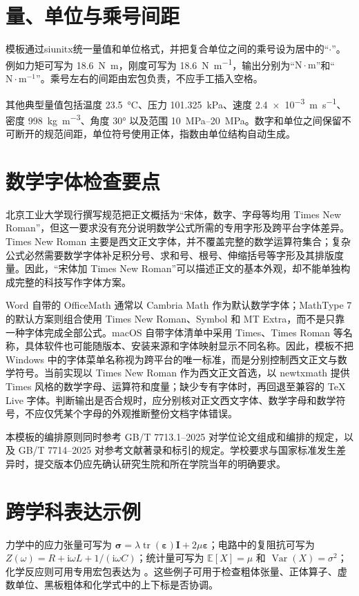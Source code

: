 \section{量、单位与乘号间距}
模板通过\mbox{siunitx}统一量值和单位格式，并把复合单位之间的乘号设为居中的“$\cdot$”。例如力矩可写为 \qty{18.6}{\newton\meter}，刚度可写为 \qty{18.6}{\newton\per\meter}，输出分别为“$\mathrm{N\cdot m}$”和“$\mathrm{N\cdot m^{-1}}$”。乘号左右的间距由宏包负责，不应手工插入空格。

其他典型量值包括温度 \qty{23.5}{\degreeCelsius}、压力 \qty{101.325}{\kilo\pascal}、速度 \qty{2.4e-3}{\meter\per\second}、密度 \qty{998}{\kilogram\per\cubic\meter}、角度 \ang{30} 以及范围 \qtyrange{10}{20}{\mega\pascal}。数字和单位之间保留不可断开的规范间距，单位符号使用正体，指数由单位结构自动生成。

\section{数学字体检查要点}
北京工业大学现行撰写规范把正文概括为“宋体，数字、字母等均用 Times New Roman”，但这一要求没有充分说明数学公式所需的专用字形及跨平台字体差异\cite{bjut2023guide}。Times New Roman 主要是西文正文字体，并不覆盖完整的数学运算符集合；复杂公式必然需要数学字体补足积分号、求和号、根号、伸缩括号等字形及其排版度量。因此，“宋体加 Times New Roman”可以描述正文的基本外观，却不能单独构成完整的科技写作字体方案。

Word 自带的 OfficeMath 通常以 Cambria Math 作为默认数学字体；MathType 7 的默认方案则组合使用 Times New Roman、Symbol 和 MT Extra，而不是只靠一种字体完成全部公式。macOS 自带字体清单中采用 Times、Times Roman 等名称，具体软件也可能随版本、安装来源和字体映射显示不同名称。因此，模板不把 Windows 中的字体菜单名称视为跨平台的唯一标准，而是分别控制西文正文与数学符号。当前实现以 Times New Roman 作为西文正文首选，以 \textsf{newtxmath} 提供 Times 风格的数学字母、运算符和度量；缺少专有字体时，再回退至兼容的 TeX Live 字体。判断输出是否合规时，应分别核对正文西文字体、数学字母和数学符号，不应仅凭某个字母的外观推断整份文档字体错误。

本模板的编排原则同时参考 GB/T 7713.1--2025 对学位论文组成和编排的规定，以及 GB/T 7714--2025 对参考文献著录和标引的规定\cite{gbt7713_1_2025,gbt7714_2025}。学校要求与国家标准发生差异时，提交版本仍应先确认研究生院和所在学院当年的明确要求。

\section{跨学科表达示例}
力学中的应力张量可写为 $\boldsymbol{\sigma}=\lambda\operatorname{tr}(\boldsymbol{\varepsilon})\boldsymbol{I}+2\mu\boldsymbol{\varepsilon}$；电路中的复阻抗可写为 $Z(\omega)=R+\mathrm{i}\omega L+1/(\mathrm{i}\omega C)$；统计量可写为 $\mathbb{E}[X]=\mu$ 和 $\operatorname{Var}(X)=\sigma^2$；化学反应则可用专用宏包表达为 。这些例子可用于检查粗体张量、正体算子、虚数单位、黑板粗体和化学式中的上下标是否协调。
